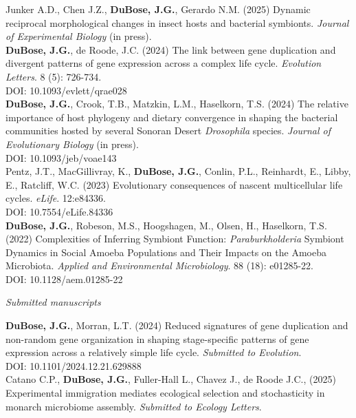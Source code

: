 \documentclass{article}
\begin{document}
\hangindent=0.7cm Junker A.D., Chen J.Z., \textbf{DuBose, J.G.}, Gerardo N.M. (2025) Dynamic reciprocal morphological changes in insect hosts and bacterial symbionts. \emph{Journal of Experimental Biology} (in press). \\

\hangindent=0.7cm \textbf{DuBose, J.G.}, de Roode, J.C. (2024) The link between gene duplication and divergent patterns of gene expression across a complex life cycle. \emph{Evolution Letters}. 8 (5): 726-734. \\
DOI: 10.1093/evlett/qrae028 \\

\hangindent=0.7cm \textbf{DuBose, J.G.}, Crook, T.B., Matzkin, L.M., Haselkorn, T.S. (2024) The relative importance of host phylogeny and dietary convergence in shaping the bacterial communities hosted by several Sonoran Desert \emph{Drosophila} species. \emph{Journal of Evolutionary Biology} (in press).\\ 
DOI: 10.1093/jeb/voae143 \\

\hangindent=0.7cm Pentz, J.T., MacGillivray, K., \textbf{DuBose, J.G.}, Conlin, P.L., Reinhardt, E., Libby, E., Ratcliff, W.C. (2023) Evolutionary consequences of nascent multicellular life cycles. \emph{eLife}. 12:e84336. \\
DOI: 10.7554/eLife.84336 \\

\hangindent=0.7cm \textbf{DuBose, J.G.}, Robeson, M.S., Hoogshagen, M., Olsen, H., Haselkorn, T.S. (2022) Complexities of Inferring Symbiont Function: \emph{Paraburkholderia} Symbiont Dynamics in Social Amoeba Populations and Their Impacts on the Amoeba Microbiota. \emph{Applied and Environmental Microbiology}. 88 (18): e01285-22.\\
DOI: 10.1128/aem.01285-22 \\

\begin{flushleft}
\emph{Submitted manuscripts}
\end{flushleft}

\hangindent=0.7cm \textbf{DuBose, J.G.}, Morran, L.T. (2024) Reduced signatures of gene duplication and non-random gene organization in shaping stage-specific patterns of gene expression across a relatively simple life cycle. \emph{Submitted to Evolution}.\\ 
DOI: 10.1101/2024.12.21.629888 \\

\hangindent=0.7cm Catano C.P., \textbf{DuBose, J.G.}, Fuller-Hall L., Chavez J., de Roode J.C., (2025) Experimental immigration mediates ecological selection and stochasticity in monarch microbiome assembly. \emph{Submitted to Ecology Letters}. \\
\end{document}
